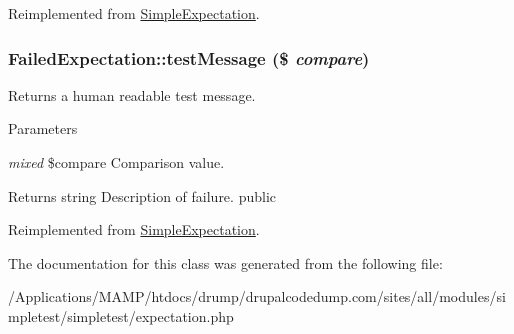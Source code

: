 Reimplemented from \hyperlink{class_simple_expectation_aa2b98f827e7487ebe12cedb9ad39d061}{SimpleExpectation}.\hypertarget{class_failed_expectation_af16f47796c075ab58563a59002340614}{
\subsubsection[{testMessage}]{\setlength{\rightskip}{0pt plus 5cm}FailedExpectation::testMessage (\$ {\em compare})}}
\label{class_failed_expectation_af16f47796c075ab58563a59002340614}
Returns a human readable test message. 
\begin{DoxyParams}{Parameters}
\item[{\em mixed}]\$compare Comparison value. \end{DoxyParams}
\begin{DoxyReturn}{Returns}
string Description of failure.  public 
\end{DoxyReturn}


Reimplemented from \hyperlink{class_simple_expectation_a15b69edf659c76f6543aa98d8d85b025}{SimpleExpectation}.

The documentation for this class was generated from the following file:\begin{DoxyCompactItemize}
\item 
/Applications/MAMP/htdocs/drump/drupalcodedump.com/sites/all/modules/simpletest/simpletest/expectation.php\end{DoxyCompactItemize}
